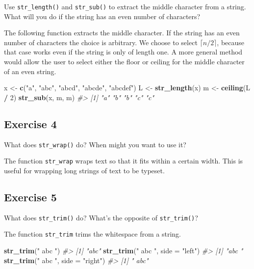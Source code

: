 \documentclass[]{book}
\newenvironment{Shaded}{\begin{snugshade}}{\end{snugshade}}
\newcommand{\CommentTok}[1]{\textcolor[rgb]{0.56,0.35,0.01}{\textit{#1}}}
\newcommand{\DataTypeTok}[1]{\textcolor[rgb]{0.13,0.29,0.53}{#1}}
\newcommand{\DecValTok}[1]{\textcolor[rgb]{0.00,0.00,0.81}{#1}}
\newcommand{\KeywordTok}[1]{\textcolor[rgb]{0.13,0.29,0.53}{\textbf{#1}}}
\newcommand{\NormalTok}[1]{#1}
\newcommand{\OperatorTok}[1]{\textcolor[rgb]{0.81,0.36,0.00}{\textbf{#1}}}
\newcommand{\StringTok}[1]{\textcolor[rgb]{0.31,0.60,0.02}{#1}}
\theoremstyle{definition}
\theoremstyle{definition}
\theoremstyle{definition}
\theoremstyle{remark}
\begin{document}
Use \texttt{str\_length()} and \texttt{str\_sub()} to extract the middle
character from a string. What will you do if the string has an even
number of characters?

The following function extracts the middle character. If the string has
an even number of characters the choice is arbitrary. We choose to
select \(\lceil n / 2 \rceil\), because that case works even if the
string is only of length one. A more general method would allow the user
to select either the floor or ceiling for the middle character of an
even string.

\begin{Shaded}
\begin{Highlighting}[]
\NormalTok{x <-}\StringTok{ }\KeywordTok{c}\NormalTok{(}\StringTok{"a"}\NormalTok{, }\StringTok{"abc"}\NormalTok{, }\StringTok{"abcd"}\NormalTok{, }\StringTok{"abcde"}\NormalTok{, }\StringTok{"abcdef"}\NormalTok{)}
\NormalTok{L <-}\StringTok{ }\KeywordTok{str_length}\NormalTok{(x)}
\NormalTok{m <-}\StringTok{ }\KeywordTok{ceiling}\NormalTok{(L }\OperatorTok{/}\StringTok{ }\DecValTok{2}\NormalTok{)}
\KeywordTok{str_sub}\NormalTok{(x, m, m)}
\CommentTok{#> [1] "a" "b" "b" "c" "c"}
\end{Highlighting}
\end{Shaded}

\hypertarget{exercise-4-18}{%
\subsection{Exercise 4}\label{exercise-4-18}}

What does \texttt{str\_wrap()} do? When might you want to use it?

The function \texttt{str\_wrap} wraps text so that it fits within a
certain width. This is useful for wrapping long strings of text to be
typeset.

\hypertarget{exercise-5-9}{%
\subsection{Exercise 5}\label{exercise-5-9}}

What does \texttt{str\_trim()} do? What's the opposite of
\texttt{str\_trim()}?

The function \texttt{str\_trim} trims the whitespace from a string.

\begin{Shaded}
\begin{Highlighting}[]
\KeywordTok{str_trim}\NormalTok{(}\StringTok{" abc "}\NormalTok{)}
\CommentTok{#> [1] "abc"}
\KeywordTok{str_trim}\NormalTok{(}\StringTok{" abc "}\NormalTok{, }\DataTypeTok{side =} \StringTok{"left"}\NormalTok{)}
\CommentTok{#> [1] "abc "}
\KeywordTok{str_trim}\NormalTok{(}\StringTok{" abc "}\NormalTok{, }\DataTypeTok{side =} \StringTok{"right"}\NormalTok{)}
\CommentTok{#> [1] " abc"}
\end{Highlighting}
\end{Shaded}
\end{document}
